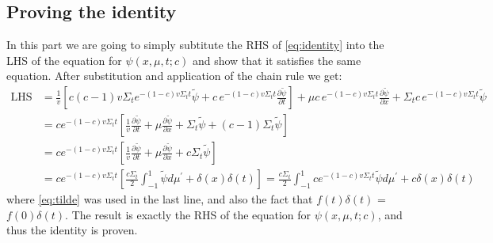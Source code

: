 \documentclass[11pt]{article}
\begin{document}
\subsection*{Proving the identity}
In this part we are going to simply subtitute the RHS of \ref{eq:identity} into the LHS of the equation for $\psi(x,\mu,t;c)$ and show that it satisfies the same equation. After substitution and application of the chain rule we get:
\begin{align}
    \text{LHS} &= \frac{1}{v}\left[c(c-1)v\Sigma_t e^{-(1-c)v\Sigma_t t}\tilde{\psi}+c\, e^{-(1-c)v\Sigma_t t}\frac{\partial\tilde{\psi}}{\partial t}\right] + \mu c\, e^{-(1-c)v\Sigma_t t}\frac{\partial\tilde{\psi}}{\partial x} + \Sigma_t c\, e^{-(1-c)v\Sigma_t t}\tilde{\psi} \\
    &= c e^{-(1-c)v\Sigma_t t}\left[\frac{1}{v}\frac{\partial\tilde{\psi}}{\partial t} + \mu \frac{\partial\tilde{\psi}}{\partial x} + \Sigma_t \tilde{\psi} + (c-1)\Sigma_t\tilde{\psi}\right] \\
    &= c e^{-(1-c)v\Sigma_t t}\left[\frac{1}{v}\frac{\partial\tilde{\psi}}{\partial t} + \mu \frac{\partial\tilde{\psi}}{\partial x} + c\Sigma_t \tilde{\psi}\right] \\
    &= c e^{-(1-c)v\Sigma_t t}\left[\frac{c\Sigma_t}{2}\int_{-1}^{1} \tilde{\psi}d\mu^\prime + \delta(x)\delta(t)\right] = \frac{c\Sigma_t}{2}\int_{-1}^{1} c e^{-(1-c)v\Sigma_t t}\tilde{\psi}d\mu^\prime + c\delta(x)\delta(t)
\end{align}
where \ref{eq:tilde} was used in the last line, and also the fact that $f(t)\delta(t)$ = $f(0)\delta(t)$. The result is exactly the RHS of the equation for $\psi(x,\mu,t;c)$, and thus the identity is proven.

\newpage
\end{document}
